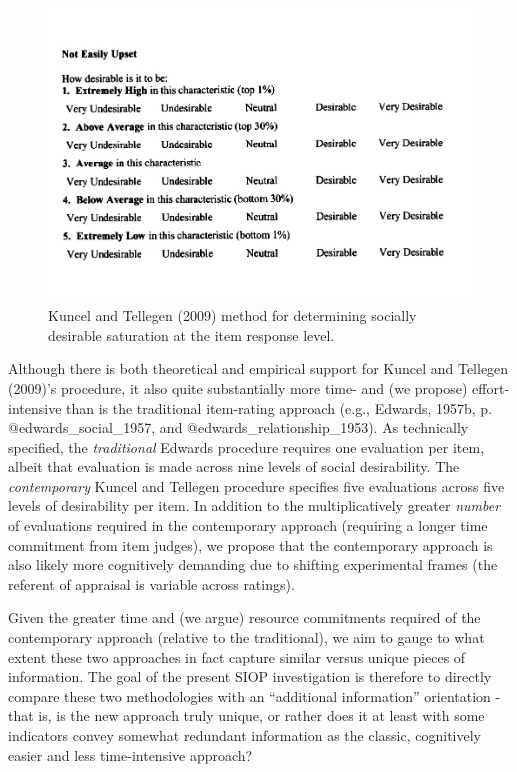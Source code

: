 \documentclass[
  english,
  ,jou]{apa6}
\begin{document}
\begin{figure}
\centering
\includegraphics{KuncelTellegen2_files/figure-latex/Figure1-1.pdf}
\caption{\label{fig:Figure1}Kuncel and Tellegen (2009) method for determining socially desirable saturation at the item response level.}
\end{figure}

Although there is both theoretical and empirical support for Kuncel and Tellegen (2009)'s procedure, it also quite substantially more time- and (we propose) effort-intensive than is the traditional item-rating approach (e.g., Edwards, 1957b, p. @edwards\_social\_1957, and @edwards\_relationship\_1953). As technically specified, the \emph{traditional} Edwards procedure requires one evaluation per item, albeit that evaluation is made across nine levels of social desirability. The \emph{contemporary} Kuncel and Tellegen procedure specifies five evaluations across five levels of desirability per item. In addition to the multiplicatively greater \emph{number} of evaluations required in the contemporary approach (requiring a longer time commitment from item judges), we propose that the contemporary approach is also likely more cognitively demanding due to shifting experimental frames (the referent of appraisal is variable across ratings).

Given the greater time and (we argue) resource commitments required of the contemporary approach (relative to the traditional), we aim to gauge to what extent these two approaches in fact capture similar versus unique pieces of information. The goal of the present SIOP investigation is therefore to directly compare these two methodologies with an \enquote{additional information} orientation - that is, is the new approach truly unique, or rather does it at least with some indicators convey somewhat redundant information as the classic, cognitively easier and less time-intensive approach?
\end{document}
